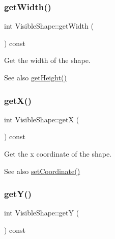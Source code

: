 \subsubsection{\texorpdfstring{get\+Width()}{getWidth()}}
{\footnotesize\ttfamily int Visible\+Shape\+::get\+Width (\begin{DoxyParamCaption}{ }\end{DoxyParamCaption}) const\hspace{0.3cm}{\ttfamily [virtual]}}



Get the width of the shape. 

\begin{DoxySeeAlso}{See also}
\mbox{\hyperlink{class_visible_shape_a1ce25935c729146932d649f88215ffbe}{get\+Height()}} 
\end{DoxySeeAlso}
\mbox{\label{class_visible_shape_a623ee2bd2e408da908ec5b210347b36e}} 
\subsubsection{\texorpdfstring{get\+X()}{getX()}}
{\footnotesize\ttfamily int Visible\+Shape\+::getX (\begin{DoxyParamCaption}{ }\end{DoxyParamCaption}) const\hspace{0.3cm}{\ttfamily [virtual]}}



Get the x coordinate of the shape. 

\begin{DoxySeeAlso}{See also}
\mbox{\hyperlink{class_visible_shape_a350f7faac22e405df7c4012fe9d03fac}{set\+Coordinate()}} 
\end{DoxySeeAlso}
\mbox{\label{class_visible_shape_ace747d31bf685044d815b6fa1944055e}} 
\subsubsection{\texorpdfstring{get\+Y()}{getY()}}
{\footnotesize\ttfamily int Visible\+Shape\+::getY (\begin{DoxyParamCaption}{ }\end{DoxyParamCaption}) const\hspace{0.3cm}{\ttfamily [virtual]}}



